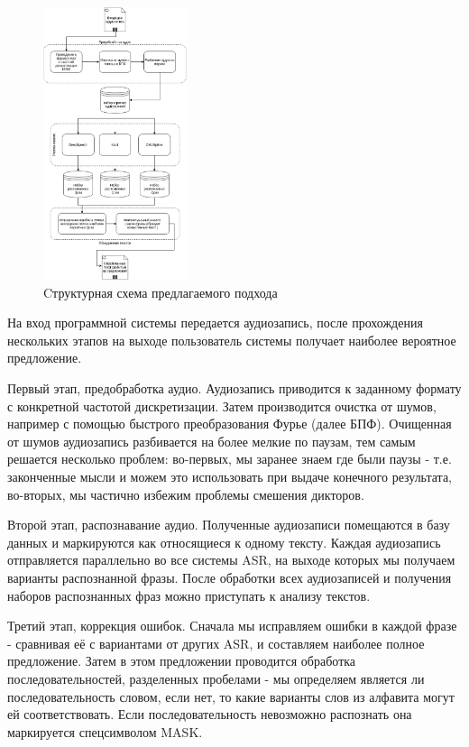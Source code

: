 \documentclass[conference]{IEEEtran}
\begin{document}
\begin{figure}[h]
\centering
\includegraphics[width=0.375\textwidth]{./Diagram1.jpg}
\caption{Cтруктурная схема предлагаемого подхода}
\label{fig:Panel}
\end{figure}

На вход программной системы передается аудиозапись, после прохождения нескольких этапов на выходе пользователь системы получает наиболее вероятное предложение.

Первый этап, предобработка аудио. Аудиозапись приводится к заданному формату с конкретной частотой дискретизации. Затем производится очистка от шумов, например с помощью быстрого преобразования Фурье (далее БПФ). Очищенная от шумов аудиозапись разбивается на более мелкие по паузам, тем самым решается несколько проблем: во-первых, мы заранее знаем где были паузы - т.е. законченные мысли и можем это использовать при выдаче конечного результата, во-вторых, мы частично избежим проблемы смешения дикторов.

Второй этап, распознавание аудио. Полученные аудиозаписи помещаются в базу данных и маркируются как относящиеся к одному тексту. Каждая аудиозапись отправляется параллельно во все системы ASR, на выходе которых мы получаем варианты распознанной фразы. После обработки всех аудиозаписей и получения наборов распознанных фраз можно приступать к анализу текстов.

Третий этап, коррекция ошибок. Сначала мы исправляем ошибки в каждой фразе - сравнивая её с вариантами от других ASR, и составляем наиболее полное предложение. Затем в этом предложении проводится обработка последовательностей, разделенных пробелами - мы определяем является ли последовательность словом, если нет, то какие варианты слов из алфавита могут ей соответствовать. Если последовательность невозможно распознать она маркируется спецсимволом MASK.
\end{document}

